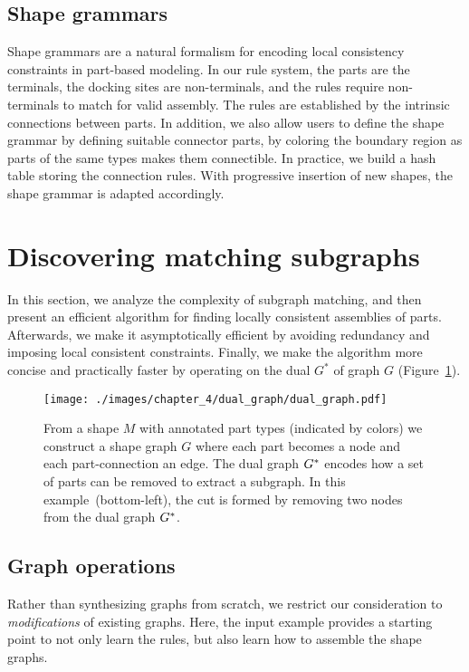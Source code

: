 \subsection{Shape grammars}

Shape grammars are a natural formalism for encoding local consistency constraints in part-based modeling. In our rule system, the parts are the terminals, the docking sites are non-terminals, and the rules require non-terminals to match for valid assembly. The rules are established by the intrinsic connections between parts. In addition, we also allow users to define the shape grammar by defining suitable connector parts, by coloring the boundary region as parts of the same types makes them connectible.
In practice, we build a hash table storing the connection rules. With progressive insertion of new shapes, the shape grammar is adapted accordingly.

\section{Discovering matching subgraphs}

In this section, we analyze the complexity of subgraph matching, and then present an efficient algorithm for finding locally consistent assemblies of parts. Afterwards, we make it asymptotically efficient by avoiding redundancy and imposing local consistent constraints. Finally, we make the algorithm more concise and practically faster by operating on the dual $G^*$  of graph $G$ (Figure~\ref{fig:dual_graph}).

\begin{figure}[t!]
  \texttt{[image: ./images/chapter\_4/dual\_graph/dual\_graph.pdf]}
  \caption{From a shape $M$ with annotated part types (indicated by colors) we construct a shape graph $G$ where each part becomes a node and each part-connection an edge. The dual graph $G^*$ encodes how a set of parts can be removed to extract a subgraph. In this example~(bottom-left), the cut is formed by removing two nodes from the dual graph $G^*$.
  }\label{fig:dual_graph}
\end{figure}

\subsection{Graph operations}

Rather than synthesizing graphs from scratch, we restrict our consideration to \emph{modifications} of existing graphs. Here, the input example provides a starting point to not only learn the rules, but also learn how to assemble the shape graphs.

